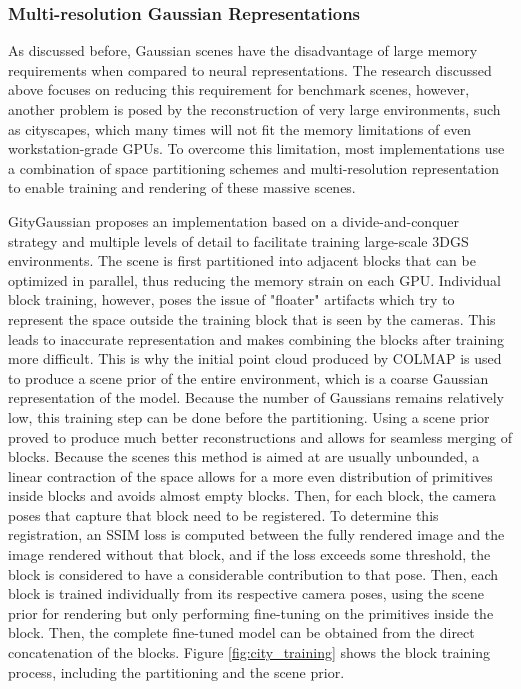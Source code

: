 \subsubsection{Multi-resolution Gaussian Representations}
As discussed before, Gaussian scenes have the disadvantage of large memory requirements when compared to neural representations. The research discussed above focuses on reducing this requirement for benchmark scenes, however, another problem is posed by the reconstruction of very large environments, such as cityscapes, which many times will not fit the memory limitations of even workstation-grade GPUs. To overcome this limitation, most implementations use a combination of space partitioning schemes and multi-resolution representation to enable training and rendering of these massive scenes.

GityGaussian \cite{liu2024citygaussian} proposes an implementation based on a divide-and-conquer strategy and multiple levels of detail to facilitate training large-scale 3DGS environments. The scene is first partitioned into adjacent blocks that can be optimized in parallel, thus reducing the memory strain on each GPU. Individual block training, however, poses the issue of "floater" artifacts which try to represent the space outside the training block that is seen by the cameras. This leads to inaccurate representation and makes combining the blocks after training more difficult. This is why the initial point cloud produced by COLMAP is used to produce a scene prior of the entire environment, which is a coarse Gaussian representation of the model. Because the number of Gaussians remains relatively low, this training step can be done before the partitioning. Using a scene prior proved to produce much better reconstructions and allows for seamless merging of blocks. Because the scenes this method is aimed at are usually unbounded, a linear contraction of the space allows for a more even distribution of primitives inside blocks and avoids almost empty blocks. Then, for each block, the camera poses that capture that block need to be registered. To determine this registration, an SSIM loss is computed between the fully rendered image and the image rendered without that block, and if the loss exceeds some threshold, the block is considered to have a considerable contribution to that pose. Then, each block is trained individually from its respective camera poses, using the scene prior for rendering but only performing fine-tuning on the primitives inside the block. Then, the complete fine-tuned model can be obtained from the direct concatenation of the blocks. Figure \ref{fig:city_training} shows the block training process, including the partitioning and the scene prior.

